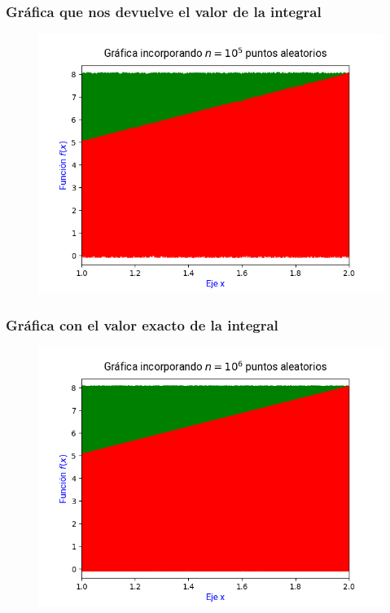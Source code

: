 \documentclass[12pt]{beamer}
\begin{document}
\begin{frame}
\frametitle{Gráfica que nos devuelve el valor de la integral}
\begin{figure}
    \centering
    \includegraphics[scale=0.55]{Imagenes/area_puntos_05.png}
\end{figure}
\end{frame}
\begin{frame}
\frametitle{Gráfica con el valor exacto de la integral}
\begin{figure}
    \centering
    \includegraphics[scale=0.55]{Imagenes/area_puntos_06.png}
\end{figure}
\end{frame}
\end{document}
